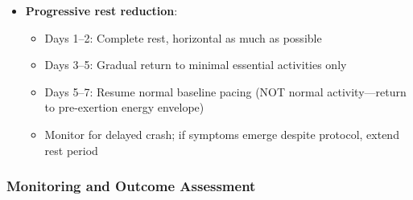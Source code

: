\begin{itemize}
    \item \textbf{Progressive rest reduction}:
    \begin{itemize}
        \item Days 1--2: Complete rest, horizontal as much as possible
        \item Days 3--5: Gradual return to minimal essential activities only
        \item Days 5--7: Resume normal baseline pacing (NOT normal activity—return to pre-exertion energy envelope)
        \item Monitor for delayed crash; if symptoms emerge despite protocol, extend rest period
    \end{itemize}
\end{itemize}

\subsubsection{Monitoring and Outcome Assessment}

